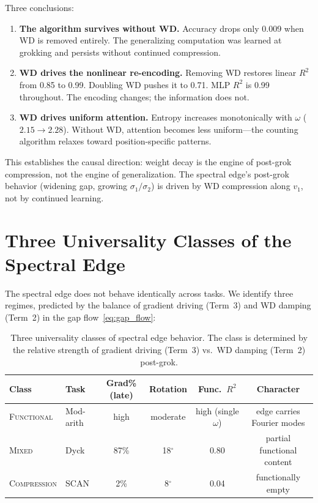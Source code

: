 \documentclass[11pt]{article}
\begin{document}
Three conclusions:
\begin{enumerate}[nosep]
    \item \textbf{The algorithm survives without WD.}  Accuracy drops only 0.009 when WD is removed entirely.  The generalizing computation was learned at grokking and persists without continued compression.
    \item \textbf{WD drives the nonlinear re-encoding.}  Removing WD restores linear $R^2$ from 0.85 to 0.99.  Doubling WD pushes it to 0.71.  MLP $R^2$ is 0.99 throughout.  The encoding changes; the information does not.
    \item \textbf{WD drives uniform attention.}  Entropy increases monotonically with $\omega$ ($2.15 \to 2.28$).  Without WD, attention becomes less uniform---the counting algorithm relaxes toward position-specific patterns.
\end{enumerate}

This establishes the causal direction: weight decay is the engine of post-grok compression, not the engine of generalization.
The spectral edge's post-grok behavior (widening gap, growing $\sigma_1/\sigma_2$) is driven by WD compression along $v_1$, not by continued learning.


\section{Three Universality Classes of the Spectral Edge}
\label{sec:universality}

The spectral edge does not behave identically across tasks.
We identify three regimes, predicted by the balance of gradient driving (Term~3) and WD damping (Term~2) in the gap flow~\eqref{eq:gap_flow}:

\begin{table}[t]
\centering
\caption{Three universality classes of spectral edge behavior.  The class is determined by the relative strength of gradient driving (Term~3) vs.\ WD damping (Term~2) post-grok.}
\label{tab:classes}
\begin{tabular}{llcccc}
\toprule
\textbf{Class} & \textbf{Task} & \textbf{Grad\% (late)} & \textbf{Rotation} & \textbf{Func.\ $R^2$} & \textbf{Character} \\
\midrule
\textsc{Functional}  & Mod-arith & high & moderate & high (single $\omega$) & edge carries Fourier modes \\
\textsc{Mixed}        & Dyck      & 87\% & 18$^\circ$ & 0.80 & partial functional content \\
\textsc{Compression}  & SCAN      & 2\%  & 8$^\circ$  & 0.04 & functionally empty \\
\bottomrule
\end{tabular}
\end{table}
\end{document}
